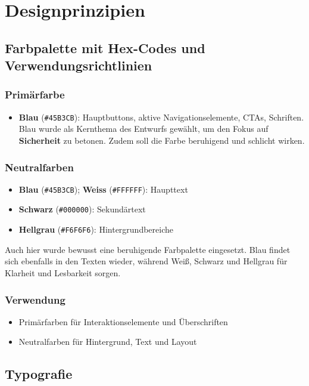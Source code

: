 \section{Designprinzipien}
\subsection{Farbpalette mit Hex-Codes und Verwendungsrichtlinien}

\subsubsection{Primärfarbe}
\begin{itemize}
	\item \textbf{Blau} (\texttt{\#45B3CB}): Hauptbuttons, aktive Navigationselemente, CTAs, Schriften.  
	Blau wurde als Kernthema des Entwurfs gewählt, um den Fokus auf \textbf{Sicherheit} zu betonen. Zudem soll die Farbe beruhigend und schlicht wirken.
\end{itemize}

\subsubsection{Neutralfarben}
\begin{itemize}
	\item \textbf{Blau} (\texttt{\#45B3CB}); \textbf{Weiss} (\texttt{\#FFFFFF}): Haupttext
	\item \textbf{Schwarz} (\texttt{\#000000}): Sekundärtext
	\item \textbf{Hellgrau} (\texttt{\#F6F6F6}): Hintergrundbereiche
\end{itemize}
Auch hier wurde bewusst eine beruhigende Farbpalette eingesetzt. Blau findet sich ebenfalls in den Texten wieder, während Weiß, Schwarz und Hellgrau für Klarheit und Lesbarkeit sorgen.

\subsubsection{Verwendung}
\begin{itemize}
	\item Primärfarben für Interaktionselemente und Überschriften
	\item Neutralfarben für Hintergrund, Text und Layout
\end{itemize}

\subsection{Typografie}

